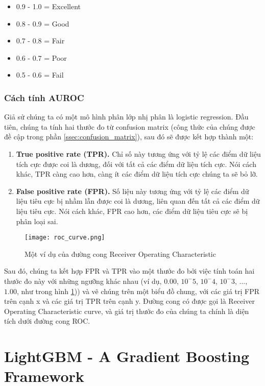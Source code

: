 \begin{itemize}
\item 0.9 - 1.0 = Excellent
\item 0.8 - 0.9 = Good
\item 0.7 - 0.8 = Fair
\item 0.6 - 0.7 = Poor
\item 0.5 - 0.6 = Fail
\end{itemize}

\subsubsection{Cách tính AUROC}

Giả sử chúng ta có một mô hình phân lớp nhị phân là logistic regression. Đầu tiên, chúng ta tính hai thước đo từ confusion matrix (công thức của chúng được đề cập trong phần \ref{ssec:confusion_matrix}), sau đó sẽ được kết hợp thành một:

\begin{enumerate}
    \item \textbf{True positive rate (TPR).} Chỉ số này tương ứng với tỷ lệ các điểm dữ liệu tích cực được coi là dương, đối với tất cả các điểm dữ liệu tích cực. Nói cách khác, TPR càng cao hơn, càng ít các điểm dữ liệu tích cực chúng ta sẽ bỏ lỡ.
    \item \textbf{False positive rate (FPR).} Số liệu này tương ứng với tỷ lệ các điểm dữ liệu tiêu cực bị nhầm lẫn được coi là dương, liên quan đến tất cả các điểm dữ liệu tiêu cực. Nói cách khác, FPR cao hơn, các điểm dữ liệu tiêu cực sẽ bị phân loại sai.
\end{enumerate}

\begin{figure}[H]
    \centering    
    \texttt{[image: roc\_curve.png]}
    \caption{Một ví dụ của đường cong Receiver Operating Characteristic}
    \label{fig:auroc}
\end{figure}

Sau đó, chúng ta kết hợp FPR và TPR vào một thước đo bởi việc tính toán hai thước đo này với những ngưỡng khác nhau (ví dụ, $0.00$, $10^-5$, $10^-4$, $10^-3$, ..., $1.00$, như trong hình \ref{fig:auroc})) và vẽ chúng trên một biểu đồ chung, với các giá trị FPR trên cạnh x và các giá trị TPR trên cạnh y. Đường cong có được gọi là Receiver Operating Characteristic curve, và giá trị thước đo của chúng ta chính là diện tích dưới đường cong ROC.

\section{LightGBM - A Gradient Boosting Framework}

